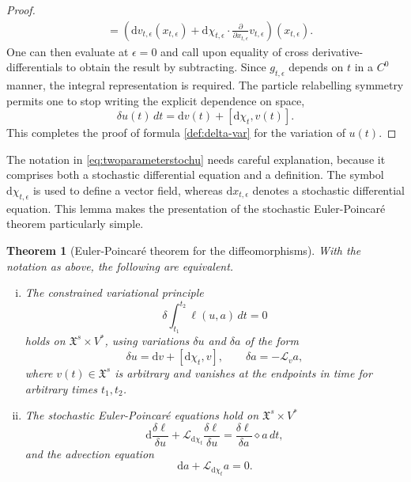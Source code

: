 \documentclass[11pt, oneside]{article}   	%
\numberwithin{equation}{section}
\theoremstyle{plain}
\newtheorem{theorem}{Theorem}[section]
\theoremstyle{definition}
\theoremstyle{remark}
\newcommand{\<}{\langle}
\renewcommand{\>}{\rangle}
\def\rmd{{\mathrm{d}}}
\begin{document}
\begin{proof}
\begin{equation}
\begin{aligned}
&=  \left( {\rmd}v_{t,\epsilon}(x_{t,\epsilon}) + {\rmd}\chi_{t,\epsilon}\cdot\frac{\partial}{\partial x_{t,\epsilon}}v_{t,\epsilon}\right)(x_{t,\epsilon}).
\end{aligned}
\end{equation}
One can then evaluate at $\epsilon=0$ and call upon equality of cross derivative-differentials to obtain the result by subtracting. Since $g_{t,\epsilon}$ depends on $t$ in a $C^0$ manner, the integral representation is required. The particle relabelling symmetry permits one to stop writing the explicit dependence on space,
\begin{equation}
\delta u(t)\,dt = {\rmd}v(t) + [{\rmd}\chi_t,v(t)].
\end{equation}
This completes the proof of formula \eqref{def:delta-var} for the variation of $u(t)$.
\end{proof}
The notation in \eqref{eq:twoparameterstochu} needs careful explanation, because it comprises both a stochastic differential equation and a definition. The symbol ${\rmd}\chi_{t,\epsilon}$ is used to define a vector field, whereas ${\rmd}x_{t,\epsilon}$ denotes a stochastic differential equation. This lemma makes the presentation of the stochastic Euler-Poincar\'e theorem particularly simple.
  
\medskip

\begin{theorem}[Euler-Poincar\'e theorem for the diffeomorphisms]\label{thm:SEP}
With the notation as above, the following are equivalent.
\begin{enumerate}[i)]
\item The constrained variational principle
\begin{equation}
\delta\int_{t_1}^{t_2}\ell(u,a)\,dt = 0
\end{equation}
holds on $\mathfrak{X}^s\times V^*$, using variations $\delta u$ and $\delta a$ of the form
\begin{equation}\label{eq:epconstraints}
\delta u = {\rmd}v + [{\rmd}\chi_t,v], \qquad \delta a = -\mathcal{L}_v a,
\end{equation}
where $v(t)\in \mathfrak{X}^s$ is arbitrary and vanishes at the endpoints in time for arbitrary times $t_1,t_2$.
\item The stochastic Euler-Poincar\'e equations hold on $\mathfrak{X}^s\times V^*$
\begin{equation}
{\rmd}\frac{\delta \ell}{\delta u} + \mathcal{L}_{{\rmd}\chi_t}\frac{\delta \ell}{\delta u} = \frac{\delta \ell}{\delta a}\diamond a\,dt,
\label{eq:stochep}
\end{equation}
and the advection equation
\begin{equation}
{\rmd}a + \mathcal{L}_{{\rmd}\chi_t}a = 0.
\label{eq:stochadv}
\end{equation}
\end{enumerate}
\end{theorem} 
\end{document}
